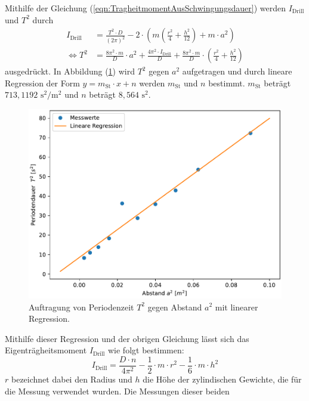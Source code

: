   Mithilfe der Gleichung (\ref{eqn:TragheitmomentAusSchwingungsdauer})
  werden $I_{\text{Drill}}$ und $T^2$ durch
  \begin{align}
    I_{\text{Drill}} &= \frac{T^{2} \cdot D}{\left(2 \pi\right)^{2}} - 2 \cdot \left(m \left(\frac{r^{2}}{4} + \frac{h^{2}}{12} \right) + m \cdot a^2 \right) \\
    \Leftrightarrow T^2 &= \frac{8 \pi^2 \cdot m}{D} \cdot a^2 + \frac{4 \pi^2 \cdot I_{\text{Drill}}}{D} + \frac{8\pi^2 \cdot m}{D} \cdot \left( \frac{r^2}{4} + \frac{h^2}{12} \right)
  \end{align}
  ausgedrückt.
  In Abbildung (\ref{fig:plot}) wird $T^2$ gegen $a^2$ aufgetragen und durch lineare Regression der Form $y = m_{\text{St}} \cdot x + n$ werden $m_{\text{St}}$ und $n$ bestimmt.
  $m_{\text{St}}$ beträgt $713,1192 \,\, \unit{\second\squared\per\meter\squared}$ und $n$ beträgt $8,564\,\, \unit{\second\squared}$. 
  \begin{figure}[H]
    \centering
    \includegraphics{plot.pdf}
    \caption{Auftragung von Periodenzeit $T^2$ gegen Abstand $a^2$ mit linearer Regression.}
    \label{fig:plot}
  \end{figure}
  Mithilfe dieser Regression und der obrigen Gleichung lässt sich das Eigenträgheitsmoment $I_{\text{Drill}}$ wie folgt bestimmen: 
  \begin{equation}
    I_{\text{Drill}} = \frac{D \cdot n}{4 \pi^2} - \frac{1}{2} \cdot m \cdot r^2 - \frac{1}{6} \cdot m \cdot h^2
  \end{equation}
  $r$ bezeichnet dabei den Radius und $h$ die Höhe der zylindischen Gewichte, die für die Messung verwendet wurden. Die Messungen dieser beiden
